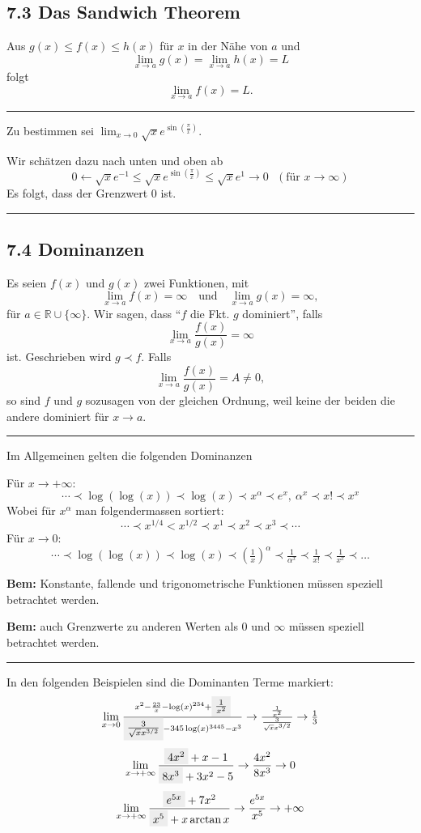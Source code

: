 \documentclass[a4paper,landscape,8pt]{extarticle}
\newcommand{\R}{\mathbb{R}}
\newcommand{\hl}[1]{\colorbox{black!7}{$#1$}}
\newcommand{\sep}{\vspace{5pt}\noindent\hrule\vspace{5pt}}
\newcommand{\Bem}{\textbf{Bem: }}
\begin{document}
\begin{multicols*}{4}
\subsection{7.3 Das Sandwich Theorem}

\Satz Aus $g(x)\leq f(x)\leq h(x)$ für $x$ in der Nähe von $a$ und
\[
\lim_{x\to a} g(x) = \lim_{x\to a} h(x) = L
\]
folgt
\[
\lim_{x\to a} f(x) = L.
\]

\sep

\Bsp Zu bestimmen sei $\lim_{x\to 0}\sqrt{x}e^{\sin(\frac{\pi}{x})}$.

Wir schätzen dazu nach unten und oben ab
\[
0\leftarrow \sqrt{x}e^{-1} \leq \sqrt{x}e^{\sin(\frac{\pi}{x})} \leq
\sqrt{x}e^{1}\rightarrow 0 \ \ \ (\text{für }x\to \infty)
\]
Es folgt, dass der Grenzwert 0 ist.

\sep

\subsection{7.4 Dominanzen}

\Def Es seien $f(x)$ und $g(x)$ zwei Funktionen, mit
\[
\lim_{x\to a} f(x) = \infty \quad\text{und}\quad \lim_{x\to a}g(x) = \infty,
\]
für $a\in\R\cup\{\infty\}$. Wir sagen, dass ``$f$ die Fkt. $g$ dominiert'',
falls
\[
\lim_{x\to a} \frac{f(x)}{g(x)}=\infty
\]
ist. Geschrieben wird $g\prec f$. Falls
\[
\lim_{x\to a} \frac{f(x)}{g(x)}=A\neq 0,
\]
so sind $f$ und $g$ sozusagen von der gleichen Ordnung, weil keine der beiden
die andere dominiert für $x\to a$.
\sep

Im Allgemeinen gelten die folgenden Dominanzen

Für $x\to+\infty$:
\[
\cdots \prec \log(\log(x)) \prec \log(x) \prec x^\alpha \prec 
e^x, \ \alpha^x \prec x! \prec x^x
\]
Wobei für $x^\alpha$ man folgendermassen sortiert:
\[
\cdots \prec x^{1/4}<x^{1/2} \prec x^1  \prec x^2 \prec x^3 \prec \cdots
\]
Für $x\to 0$:
\[
\cdots \prec \log(\log(x)) \prec \log(x) \prec \left(\tfrac{1}{x}\right)^\alpha
\prec \tfrac{1}{\alpha^x} \prec \tfrac{1}{x!} \prec \tfrac{1}{x^x} \prec \ldots
\]

\Bem Konstante, fallende und trigonometrische Funktionen müssen speziell
betrachtet werden.

\Bem auch Grenzwerte zu anderen Werten als 0 und $\infty$ müssen speziell
betrachtet werden.

\sep

\Bsp In den folgenden Beispielen sind die Dominanten Terme markiert:
\[
\lim_{x\to 0}
\tfrac{x^2-\frac{23}{x}-\log(x)^{234}
+\hl{\frac{1}{x^2}}}{\hl{\frac{3}{\sqrt{x}x^{3/2}}}-345\log(x)^{3445}-x^3}
\to
\tfrac{\frac{1}{x^2}}{\frac{3}{\sqrt{x}x^{3/2}}}
\to
\tfrac{1}{3}
\]
\[
\lim_{x\to+\infty} \frac{\hl{4x^2}+x-1}{\hl{8x^3}+3x^2-5} \to
\frac{4x^2}{8x^3}\to 0
\]
\[
\lim_{x\to+\infty} \frac{\hl{e^{5x}}+7x^2}{\hl{x^5}+x \arctan x}
\to
\frac{e^{5x}}{x^5}
\to
+\infty
\]


\end{multicols*}
\end{document}
